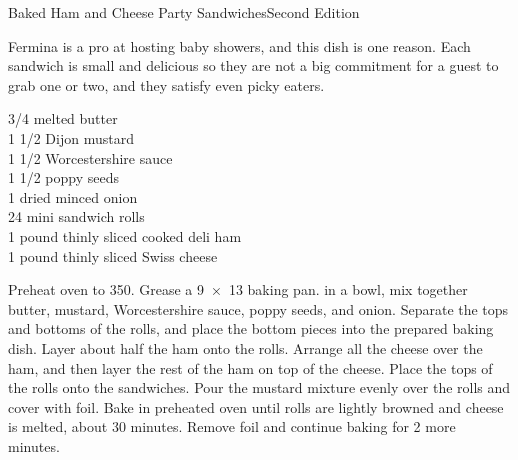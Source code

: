 \begin{entry}{Baked Ham and Cheese Party Sandwiches}{Second Edition}

\begin{open}
  Fermina is a pro at hosting baby showers, and this dish is one reason.
  Each sandwich is small and delicious
  so they are not a big commitment for a guest to grab one or two, and they
  satisfy even picky eaters.
\end{open}
\begin{ingredients}
    \SI{3/4}{\cup} melted butter\\
    1 \SI{1/2}{\tblspoon} Dijon mustard\\
    1 \SI{1/2}{\teaspoon} Worcestershire sauce\\
    1 \SI{1/2}{\tblspoon} poppy seeds\\
    \SI{1}{\tblspoon} dried minced onion\\
    24 mini sandwich rolls\\
    1 pound thinly sliced cooked deli ham\\
    1 pound thinly sliced Swiss cheese
\end{ingredients}
Preheat oven to \SI{350}{\degreeF}. Grease a \SI{9x13}{\inch} baking pan. in a
bowl, mix together butter, mustard, Worcestershire sauce, poppy seeds, and
onion. Separate the tops and bottoms of the rolls, and place the bottom pieces
into the prepared baking dish. Layer about half the ham onto the
rolls. Arrange all the cheese over the ham, and then layer the rest of the ham
on top of the cheese. Place the tops of the rolls onto the sandwiches. Pour
the mustard mixture evenly over the rolls and cover with foil. Bake in
preheated oven until rolls are lightly browned and cheese is melted, about 30
minutes. Remove foil and continue baking for 2 more minutes.
\end{entry}

